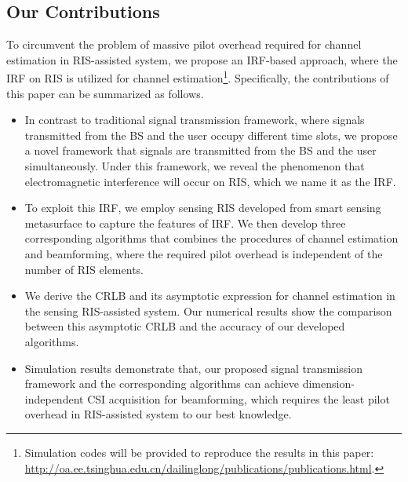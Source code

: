 \documentclass[12pt,draftclsnofoot,journal,onecolumn]{IEEEtran}
\theoremstyle{nonumberplain}
\begin{document}
\subsection{Our Contributions}
\label{Our Contributions}

To circumvent the problem of massive pilot overhead required for channel estimation in RIS-assisted system, we propose an \ac{IRF}-based approach, where the \ac{IRF} on RIS is utilized for channel estimation\footnote{Simulation codes will be provided to reproduce the results in this paper: \url{http://oa.ee.tsinghua.edu.cn/dailinglong/publications/publications.html}.}.
Specifically, the contributions of this paper can be summarized as follows.
    \begin{itemize}
        \item %
        In contrast to traditional signal transmission framework, where signals transmitted from the \ac{BS} and the user occupy different time slots, we propose a novel framework that signals are transmitted from the \ac{BS} and the user simultaneously.
        Under this framework, we reveal the phenomenon that electromagnetic interference will occur on RIS, which we name it as the \ac{IRF}.
        \item
        To exploit this \ac{IRF}, we employ sensing RIS developed from smart sensing metasurface to capture the features of \ac{IRF}.
        We then develop three corresponding algorithms that combines the procedures of channel estimation and beamforming, where the required pilot overhead is independent of the number of RIS elements.
        \item
        We derive the \ac{CRLB} and its asymptotic expression for channel estimation in the sensing RIS-assisted system.
        Our numerical results show the comparison between this asymptotic \ac{CRLB} and the accuracy of our developed algorithms.
        \item
        Simulation results demonstrate that, our proposed signal transmission framework and the corresponding algorithms can achieve dimension-independent CSI acquisition for beamforming, which requires the least pilot overhead in RIS-assisted system to our best knowledge.

\end{itemize}
\end{document}
